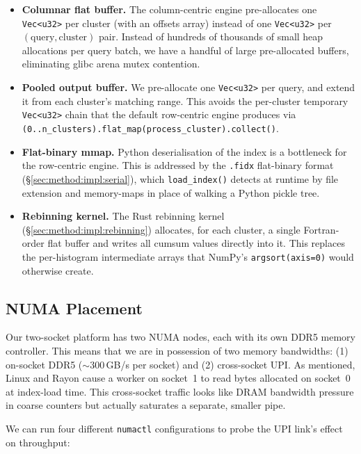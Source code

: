 \begin{itemize}
    \item \textbf{Columnar flat buffer.} The column-centric engine pre-allocates one \texttt{Vec<u32>} per cluster (with an offsets array) instead of one \texttt{Vec<u32>} per $(\text{query}, \text{cluster})$ pair. Instead of hundreds of thousands of small heap allocations per query batch, we have a handful of large pre-allocated buffers, eliminating glibc arena mutex contention.
    \item \textbf{Pooled output buffer.} We pre-allocate one \texttt{Vec<u32>} per query, and extend it from each cluster's matching range. This avoids the per-cluster temporary \texttt{Vec<u32>} chain that the default row-centric engine produces via \texttt{(0..n\_clusters).flat\_map(process\_cluster).collect()}.
    \item \textbf{Flat-binary mmap.} Python deserialisation of the index is a bottleneck for the row-centric engine. This is addressed by the \texttt{.fidx} flat-binary format (§\ref{sec:method:impl:serial}), which \texttt{load\_index()} detects at runtime by file extension and memory-maps in place of walking a Python pickle tree.
    \item \textbf{Rebinning kernel.} The Rust rebinning kernel (§\ref{sec:method:impl:rebinning}) allocates, for each cluster, a single Fortran-order flat buffer and writes all cumsum values directly into it. This replaces the per-histogram intermediate arrays that NumPy's \texttt{argsort(axis=0)} would otherwise create.
\end{itemize}


\subsection{NUMA Placement\label{sec:method:impl:numa}}

Our two-socket platform has two NUMA nodes, each with its own DDR5 memory controller. This means that we are in possession of two memory bandwidths: (1) on-socket DDR5 ($\sim\!300$\,GB/s per socket) and (2) cross-socket UPI. As mentioned, Linux and Rayon cause a worker on socket~1 to read bytes allocated on socket~0 at index-load time. This cross-socket traffic looks like DRAM bandwidth pressure in coarse counters but actually saturates a separate, smaller pipe.

We can run four different \texttt{numactl} configurations to probe the UPI link's effect on throughput:

